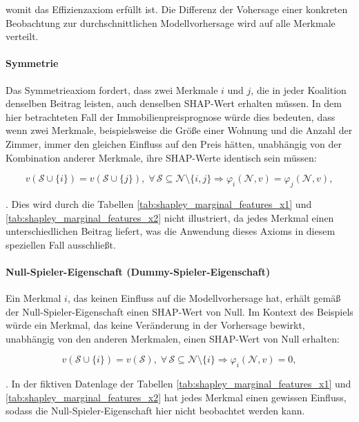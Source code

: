 womit das Effizienzaxiom erfüllt ist. Die Differenz der Vohersage 
einer konkreten Beobachtung zur durchschnittlichen 
Modellvorhersage wird auf alle Merkmale verteilt.

\paragraph{Symmetrie}

Das Symmetrieaxiom fordert, dass zwei Merkmale $i$ und $j$, die 
in jeder Koalition denselben Beitrag leisten, auch denselben SHAP-Wert 
erhalten müssen. In dem hier betrachteten Fall der Immobilienpreisprognose 
würde dies bedeuten, dass wenn zwei Merkmale, beispielsweise die Größe einer 
Wohnung und die Anzahl der Zimmer, immer den gleichen Einfluss auf den Preis hätten, 
unabhängig von der Kombination anderer Merkmale, ihre SHAP-Werte identisch 
sein müssen:

\begin{equation}
    v(\mathcal{S} \cup \{i\}) = v(\mathcal{S} \cup \{j\}), \; \forall\, \mathcal{S} \subseteq \mathcal{N} \setminus \{i, j\} \Rightarrow \varphi_i (\mathcal{N}, v) = \varphi_j (\mathcal{N}, v),
\end{equation}

\cite[S. 221]{Molnar_2022}. Dies wird durch die Tabellen \ref{tab:shapley_marginal_features_x1} und \ref{tab:shapley_marginal_features_x2} 
nicht illustriert, da jedes Merkmal einen unterschiedlichen Beitrag liefert, 
was die Anwendung dieses Axioms in diesem speziellen Fall ausschließt.

\paragraph{Null-Spieler-Eigenschaft (Dummy-Spieler-Eigenschaft)}

Ein Merkmal $i$, das keinen Einfluss auf die Modellvorhersage hat, erhält gemäß der 
Null-Spieler-Eigenschaft einen SHAP-Wert von Null. 
Im Kontext des Beispiels würde ein Merkmal, das keine Veränderung in der Vorhersage 
bewirkt, unabhängig von den anderen Merkmalen, einen SHAP-Wert von Null erhalten:

\begin{equation}
    v(\mathcal{S} \cup \{i\}) =  v(\mathcal{S}), \; \forall\, \mathcal{S} \subseteq \mathcal{N} \setminus \{i\} \Rightarrow \varphi_i (\mathcal{N}, v) = 0,
\end{equation}

\cite[S. 222]{Molnar_2022}. In der fiktiven Datenlage der Tabellen \ref{tab:shapley_marginal_features_x1} und \ref{tab:shapley_marginal_features_x2} hat jedes Merkmal 
einen gewissen Einfluss, sodass die Null-Spieler-Eigenschaft hier nicht beobachtet werden kann.

